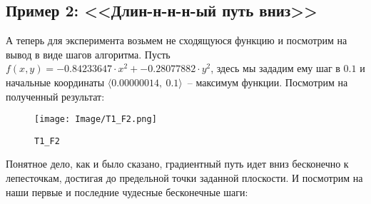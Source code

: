 \documentclass[12pt, a4paper, oneside, final]{article}
\begin{document}
	\subsection*{Пример 2: <<Длин-н-н-н-ый путь вниз>>}
	А теперь для эксперимента возьмем не сходящуюся функцию и посмотрим на вывод в виде шагов алгоритма. Пусть $f(x, y) = -0.84233647 \cdot x^{2} + -0.28077882 \cdot y^{2}$, здесь мы зададим ему шаг в $0.1$ и начальные координаты $\langle 0.00000014, ~ 0.1 \rangle$~-- максимум функции. Посмотрим на полученный результат:
	\begin{figure}[H]
		\centering
		\texttt{[image: Image/T1\_F2.png]}
		\caption*{\texttt{T1\_F2}}
	\end{figure}
	Понятное дело, как и было сказано, градиентный путь идет вниз бесконечно к лепесточкам, достигая до предельной точки заданной плоскости. И посмотрим на наши первые и последние чудесные бесконечные шаги:
\end{document}
